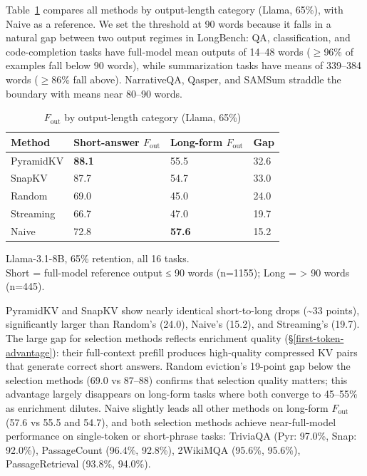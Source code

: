 \documentclass[10pt,letterpaper]{article}
\begin{document}
Table~\ref{tab:t5} compares all methods by output-length category (Llama, 65\%),
with Naive as a reference. We set the threshold at 90 words because it
falls in a natural gap between two output regimes in LongBench: QA,
classification, and code-completion tasks have full-model mean outputs
of 14--48 words ($\geq$96\% of examples fall below 90 words), while
summarization tasks have means of 339--384 words ($\geq$86\% fall above).
NarrativeQA, Qasper, and SAMSum straddle the boundary with means near
80--90 words.
\begin{table}[H]
\centering
\small
\caption{\(F_{\text{out}}\) by output-length category (Llama, 65\%)}
\label{tab:t5}
\begin{tabular}{@{}llll@{}}
\toprule
Method & Short-answer \(F_{\text{out}}\) & Long-form \(F_{\text{out}}\)
& Gap\\
\midrule
PyramidKV & \textbf{88.1} & 55.5 & 32.6\\
SnapKV    & 87.7          & 54.7 & 33.0\\
Random    & 69.0          & 45.0 & 24.0\\
Streaming & 66.7          & 47.0 & 19.7\\
Naive     & 72.8          & \textbf{57.6} & 15.2\\
\bottomrule
\end{tabular}

\center Llama-3.1-8B, 65\% retention, all 16 tasks.
\\Short = full-model reference output ≤ 90 words (n=1155); Long =
\textgreater{} 90 words (n=445).
\end{table}

PyramidKV and SnapKV show nearly identical short-to-long drops
(\textasciitilde33 points), significantly larger than Random's (24.0), Naive's (15.2), and
Streaming's (19.7). The large gap for selection methods reflects enrichment quality (§\ref{first-token-advantage}):
their full-context prefill produces high-quality compressed KV pairs that generate
correct short answers. Random eviction's 19-point gap below the selection methods
(69.0 vs 87--88) confirms that selection quality matters; this advantage largely
disappears on long-form tasks where both converge to 45--55\% as enrichment dilutes.
Naive slightly leads all other methods on long-form \(F_{\text{out}}\)
(57.6 vs 55.5 and 54.7), and both selection methods achieve near-full-model
performance on single-token or short-phrase tasks: TriviaQA (Pyr: 97.0\%, Snap: 92.0\%),
PassageCount (96.4\%, 92.8\%), 2WikiMQA (95.6\%, 95.6\%), PassageRetrieval (93.8\%, 94.0\%).
\end{document}
